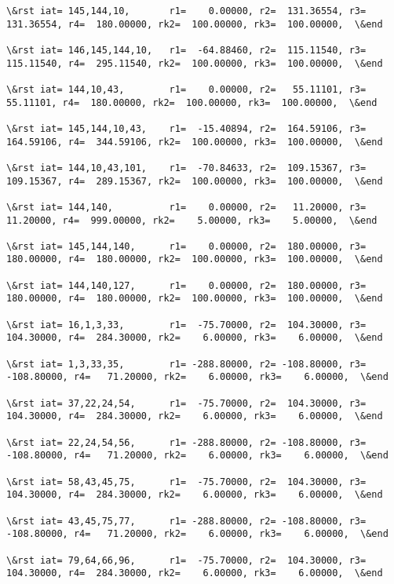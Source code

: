 \documentclass[11pt]{article}
\begin{document}
\begin{Verbatim}[commandchars=\\\{\}]
\&rst iat= 145,144,10,       r1=    0.00000, r2=  131.36554, r3=  131.36554, r4=  180.00000, rk2=  100.00000, rk3=  100.00000,  \&end

\&rst iat= 146,145,144,10,   r1=  -64.88460, r2=  115.11540, r3=  115.11540, r4=  295.11540, rk2=  100.00000, rk3=  100.00000,  \&end

\&rst iat= 144,10,43,        r1=    0.00000, r2=   55.11101, r3=   55.11101, r4=  180.00000, rk2=  100.00000, rk3=  100.00000,  \&end

\&rst iat= 145,144,10,43,    r1=  -15.40894, r2=  164.59106, r3=  164.59106, r4=  344.59106, rk2=  100.00000, rk3=  100.00000,  \&end

\&rst iat= 144,10,43,101,    r1=  -70.84633, r2=  109.15367, r3=  109.15367, r4=  289.15367, rk2=  100.00000, rk3=  100.00000,  \&end

\&rst iat= 144,140,          r1=    0.00000, r2=   11.20000, r3=   11.20000, r4=  999.00000, rk2=    5.00000, rk3=    5.00000,  \&end

\&rst iat= 145,144,140,      r1=    0.00000, r2=  180.00000, r3=  180.00000, r4=  180.00000, rk2=  100.00000, rk3=  100.00000,  \&end

\&rst iat= 144,140,127,      r1=    0.00000, r2=  180.00000, r3=  180.00000, r4=  180.00000, rk2=  100.00000, rk3=  100.00000,  \&end

\&rst iat= 16,1,3,33,        r1=  -75.70000, r2=  104.30000, r3=  104.30000, r4=  284.30000, rk2=    6.00000, rk3=    6.00000,  \&end

\&rst iat= 1,3,33,35,        r1= -288.80000, r2= -108.80000, r3= -108.80000, r4=   71.20000, rk2=    6.00000, rk3=    6.00000,  \&end

\&rst iat= 37,22,24,54,      r1=  -75.70000, r2=  104.30000, r3=  104.30000, r4=  284.30000, rk2=    6.00000, rk3=    6.00000,  \&end

\&rst iat= 22,24,54,56,      r1= -288.80000, r2= -108.80000, r3= -108.80000, r4=   71.20000, rk2=    6.00000, rk3=    6.00000,  \&end

\&rst iat= 58,43,45,75,      r1=  -75.70000, r2=  104.30000, r3=  104.30000, r4=  284.30000, rk2=    6.00000, rk3=    6.00000,  \&end

\&rst iat= 43,45,75,77,      r1= -288.80000, r2= -108.80000, r3= -108.80000, r4=   71.20000, rk2=    6.00000, rk3=    6.00000,  \&end

\&rst iat= 79,64,66,96,      r1=  -75.70000, r2=  104.30000, r3=  104.30000, r4=  284.30000, rk2=    6.00000, rk3=    6.00000,  \&end


\end{Verbatim}
\end{document}
